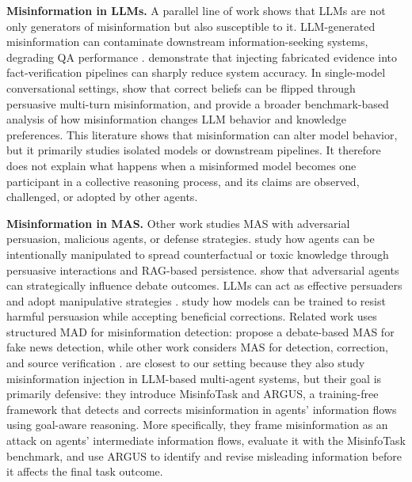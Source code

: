 \documentclass[11pt]{article}
\begin{document}
\textbf{Misinformation in LLMs.}
A parallel line of work shows that LLMs are not only generators of misinformation but also susceptible to it.
LLM-generated misinformation can contaminate downstream information-seeking systems, degrading QA performance \citep{pan-etal-2023-risk}. 
\citet{du-etal-2022-synthetic} demonstrate that injecting fabricated evidence into fact-verification pipelines can sharply reduce system accuracy. 
In single-model conversational settings, \citet{xu-etal-2024-earth} show that correct beliefs can be flipped through persuasive multi-turn misinformation, and \citet{peng-etal-2025-misinformation} provide a broader benchmark-based analysis of how misinformation changes LLM behavior and knowledge preferences. 
This literature shows that misinformation can alter model behavior, but it primarily studies isolated models or downstream pipelines. 
It therefore does not explain what happens when a misinformed model becomes one participant in a collective reasoning process, and its claims are observed, challenged, or adopted by other agents.

\textbf{Misinformation in MAS.}
Other work studies MAS with adversarial persuasion, malicious agents, or defense strategies.
\citet{JuWMC24} study how agents can be intentionally manipulated to spread counterfactual or toxic knowledge through persuasive interactions and RAG-based persistence.
\citet{AmayuelasYAH24} show that adversarial agents can strategically influence debate outcomes. 
LLMs can act as effective persuaders and adopt manipulative strategies \citep{LiuXZA25}.
\citet{stengel-eskin-etal-2025-teaching} study how models can be trained to resist harmful persuasion while accepting beneficial corrections. 
Related work uses structured MAD for misinformation detection: \citet{10.1145/3726302.3730092} propose a debate-based MAS for fake news detection, while other work considers MAS for detection, correction, and source verification \citep{gautam2025multiagentsystemsmisinformationlifecycle}. 
\citet{li2025goalawareidentificationrectificationmisinformation} are closest to our setting because they also study misinformation injection in LLM-based multi-agent systems, but their goal is primarily defensive: they introduce MisinfoTask and ARGUS, a training-free framework that detects and corrects misinformation in agents’ information flows using goal-aware reasoning.
More specifically, they frame misinformation as an attack on agents' intermediate information flows, evaluate it with the MisinfoTask benchmark, and use ARGUS to identify and revise misleading information before it affects the final task outcome.
\end{document}
